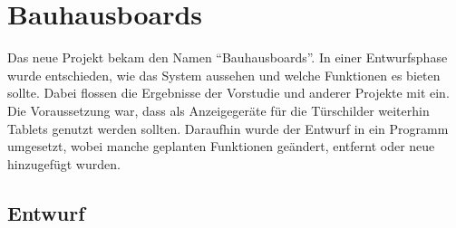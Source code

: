 \chapter{Bauhausboards}\label{BauhausBoards}
Das neue Projekt bekam den Namen ``Bauhausboards''.
In einer Entwurfsphase wurde entschieden, wie das System aussehen und welche Funktionen es bieten sollte. Dabei flossen die Ergebnisse der Vorstudie und anderer Projekte mit ein.
\\
Die Voraussetzung war, dass als Anzeigegeräte für die Türschilder weiterhin Tablets genutzt werden sollten.
Daraufhin wurde der Entwurf in ein Programm umgesetzt, wobei manche geplanten Funktionen geändert, entfernt oder neue hinzugefügt wurden.


\section{Entwurf}\label{Entwurf}
